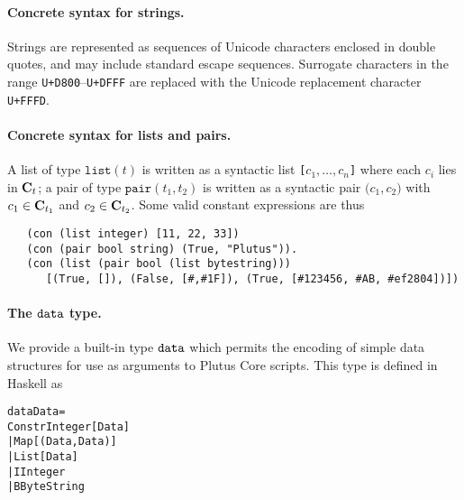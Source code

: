\paragraph{Concrete syntax for strings.} Strings are represented as sequences of Unicode characters
enclosed in double quotes, and may include standard escape sequences.  Surrogate
characters in the range \texttt{U+D800}--\texttt{U+DFFF} are replaced with the
Unicode replacement character \texttt{U+FFFD}.


\paragraph{Concrete syntax for lists and pairs.}
A list of type $\texttt{list}(t)$ is written as a syntactic list
\texttt{[$c_1, \ldots, c_n$]} where each $c_i$ lies in $\mathbf{C}_t$; a pair of type
$\texttt{pair}(t_1,t_2)$ is written as a syntactic pair $\texttt{(}c_1,c_2\texttt{)}$
with $c_1 \in \mathbf{C}_{t_1}$ and $c_2 \in \mathbf{C}_{t_2}$.  Some valid constant expressions
are thus

\begin{verbatim}
   (con (list integer) [11, 22, 33])
   (con (pair bool string) (True, "Plutus")).
   (con (list (pair bool (list bytestring)))
      [(True, []), (False, [#,#1F]), (True, [#123456, #AB, #ef2804])])
\end{verbatim}


\paragraph{The $\mathtt{data}$ type.}
We provide a built-in type $\mathtt{data}$ which permits the encoding of simple data
structures for use as arguments to Plutus Core scripts.  This type is defined in
Haskell as
\begin{alltt}
   data Data =
      Constr Integer [Data]
      | Map [(Data, Data)]
      | List [Data]
      | I Integer
      | B ByteString
\end{alltt}

